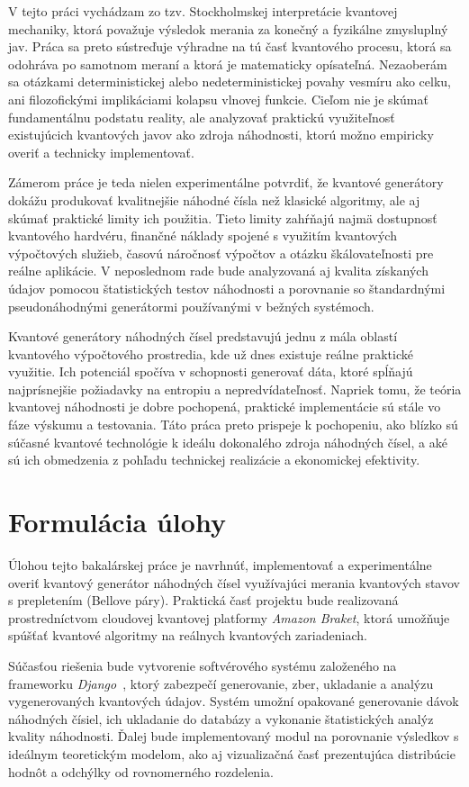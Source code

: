 V tejto práci vychádzam zo tzv. Stockholmskej interpretácie kvantovej mechaniky, ktorá považuje výsledok merania za konečný a fyzikálne zmysluplný jav.\cite{hanson1959copenhagen} Práca sa preto sústreďuje výhradne na tú časť kvantového procesu, ktorá sa odohráva po samotnom meraní a ktorá je matematicky opísateľná. Nezaoberám sa otázkami deterministickej alebo nedeterministickej povahy vesmíru ako celku, ani filozofickými implikáciami kolapsu vlnovej funkcie. Cieľom nie je skúmať fundamentálnu podstatu reality, ale analyzovať praktickú využiteľnosť existujúcich kvantových javov ako zdroja náhodnosti, ktorú možno empiricky overiť a technicky implementovať.

Zámerom práce je teda nielen experimentálne potvrdiť, že kvantové generátory dokážu produkovať kvalitnejšie náhodné čísla než klasické algoritmy, ale aj skúmať praktické limity ich použitia. Tieto limity zahŕňajú najmä dostupnosť kvantového hardvéru, finančné náklady spojené s využitím kvantových výpočtových služieb, časovú náročnosť výpočtov a otázku škálovateľnosti pre reálne aplikácie. V neposlednom rade bude analyzovaná aj kvalita získaných údajov pomocou štatistických testov náhodnosti a porovnanie so štandardnými pseudonáhodnými generátormi používanými v bežných systémoch.

Kvantové generátory náhodných čísel predstavujú jednu z mála oblastí kvantového výpočtového prostredia, kde už dnes existuje reálne praktické využitie. Ich potenciál spočíva v schopnosti generovať dáta, ktoré spĺňajú najprísnejšie požiadavky na entropiu a nepredvídateľnosť. Napriek tomu, že teória kvantovej náhodnosti je dobre pochopená, praktické implementácie sú stále vo fáze výskumu a testovania. Táto práca preto prispeje k pochopeniu, ako blízko sú súčasné kvantové technológie k ideálu dokonalého zdroja náhodných čísel, a aké sú ich obmedzenia z pohľadu technickej realizácie a ekonomickej efektivity.




\section*{Formulácia úlohy}

Úlohou tejto bakalárskej práce je navrhnúť, implementovať a experimentálne overiť kvantový generátor náhodných čísel využívajúci merania kvantových stavov s prepletením (Bellove páry). Praktická časť projektu bude realizovaná prostredníctvom cloudovej kvantovej platformy \textit{Amazon Braket}\cite{gonzalez2021cloud}, ktorá umožňuje spúšťať kvantové algoritmy na reálnych kvantových zariadeniach.

Súčasťou riešenia bude vytvorenie softvérového systému založeného na frameworku \textit{Django}~\cite{rubio2017beginning}, ktorý zabezpečí generovanie, zber, ukladanie a analýzu vygenerovaných kvantových údajov. Systém umožní opakované generovanie dávok náhodných čísiel, ich ukladanie do databázy a vykonanie štatistických analýz kvality náhodnosti. Ďalej bude implementovaný modul na porovnanie výsledkov s ideálnym teoretickým modelom, ako aj vizualizačná časť prezentujúca distribúcie hodnôt a odchýlky od rovnomerného rozdelenia.

